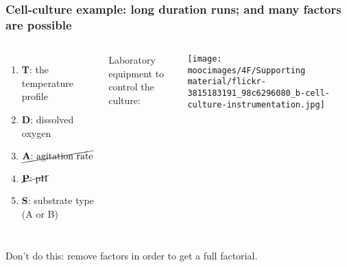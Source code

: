 \documentclass[handout,11pt,aspectratio=169,mathserif]{beamer}
\begin{document}
\begin{frame}\frametitle{Cell-culture example: long duration runs; and many factors are possible}
	\begin{columns}[c]
			\begin{enumerate}
				\item	\textbf{T}: the temperature profile
				\item	\textbf{D}: dissolved oxygen
				\item	$\cancel{\text{\textbf{A}: agitation rate}}$
				\item	$\cancel{\text{\textbf{P}: pH}}$
				\item	\textbf{S}: substrate type (A or B)
			\end{enumerate}
		
			{\color{blue} \small Laboratory equipment to control the culture:} 
			
			\vspace{0.2cm}
			
			\centerline{\texttt{[image: \\moocimages/4F/Supporting material/flickr-3815183191\_98c6296080\_b-cell-culture-instrumentation.jpg]}}
	\end{columns}

	\vfill
	{\color{red} Don't do this:} remove factors in order to get a full factorial.
	
\end{frame}
\end{document}

